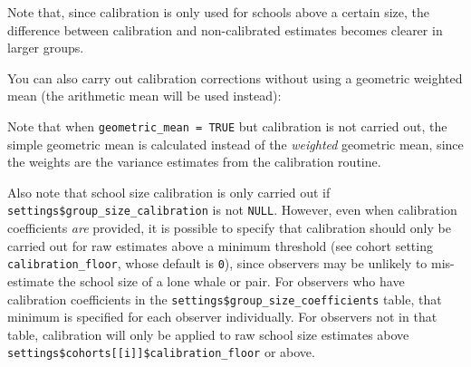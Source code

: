\documentclass[
]{book}
\newenvironment{Shaded}{\begin{snugshade}}{\end{snugshade}}
\newcommand{\DataTypeTok}[1]{\textcolor[rgb]{0.13,0.29,0.53}{#1}}
\newcommand{\DecValTok}[1]{\textcolor[rgb]{0.00,0.00,0.81}{#1}}
\newcommand{\FloatTok}[1]{\textcolor[rgb]{0.00,0.00,0.81}{#1}}
\newcommand{\KeywordTok}[1]{\textcolor[rgb]{0.13,0.29,0.53}{\textbf{#1}}}
\newcommand{\NormalTok}[1]{#1}
\newcommand{\OperatorTok}[1]{\textcolor[rgb]{0.81,0.36,0.00}{\textbf{#1}}}
\newcommand{\OtherTok}[1]{\textcolor[rgb]{0.56,0.35,0.01}{#1}}
\newcommand{\StringTok}[1]{\textcolor[rgb]{0.31,0.60,0.02}{#1}}
\begin{document}
Note that, since calibration is only used for schools above a certain size, the difference between calibration and non-calibrated estimates becomes clearer in larger groups.

You can also carry out calibration corrections without using a geometric weighted mean (the arithmetic mean will be used instead):

\begin{Shaded}
\end{Shaded}

Note that when \texttt{geometric\_mean\ =\ TRUE} but calibration is not carried out, the simple geometric mean is calculated instead of the \emph{weighted} geometric mean, since the weights are the variance estimates from the calibration routine.

Also note that school size calibration is only carried out if \texttt{settings\$group\_size\_calibration} is not \texttt{NULL}. However, even when calibration coefficients \emph{are} provided, it is possible to specify that calibration should only be carried out for raw estimates above a minimum threshold (see cohort setting \texttt{calibration\_floor}, whose default is \texttt{0}), since observers may be unlikely to mis-estimate the school size of a lone whale or pair. For observers who have calibration coefficients in the \texttt{settings\$group\_size\_coefficients} table, that minimum is specified for each observer individually. For observers not in that table, calibration will only be applied to raw school size estimates above \texttt{settings\$cohorts{[}{[}i{]}{]}\$calibration\_floor} or above.
\end{document}
